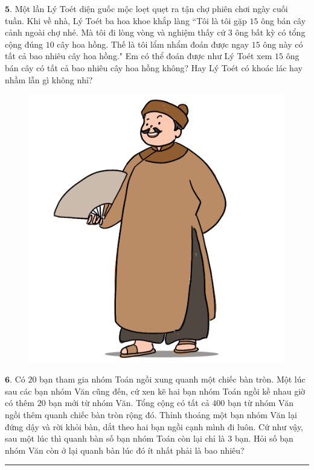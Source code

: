 \begin{multicols}{2}
\begin{figure}[H]
		\vspace*{-20pt}
	\end{figure}
	$\pmb{5.}$ Một lần Lý Toét diện guốc mộc loẹt quẹt ra tận chợ phiên chơi ngày cuối tuần. Khi về nhà, Lý Toét ba hoa khoe khắp làng ``Tôi là tôi gặp $15$ ông bán cây cảnh ngoài chợ nhé. Mà tôi đi lòng vòng và nghiệm thấy cứ $3$ ông bất kỳ có tổng cộng đúng $10$ cây hoa hồng. Thế là tôi lẩm nhẩm đoán được ngay $15$ ông này có tất cả bao nhiêu cây hoa hồng."
	\vskip 0.1cm
	Em có thể đoán được như Lý Toét xem $15$ ông bán cây có tất cả bao nhiêu cây hoa hồng không? Hay Lý Toét có khoác lác hay nhầm lẫn gì không nhỉ?
	\begin{figure}[H]
		\centering
		\captionsetup{labelformat= empty, justification=centering}
		\includegraphics[width=0.58\linewidth]{Pi12_Bai5}
		\vspace*{-15pt}
	\end{figure}
	$\pmb{6.}$ Có $20$ bạn tham gia nhóm Toán ngồi xung quanh một chiếc bàn tròn. Một lúc sau các bạn nhóm Văn cũng đến, cứ xen kẽ hai bạn nhóm Toán ngồi kề nhau giờ có thêm $20$ bạn mới từ nhóm Văn. Tổng cộng có tất cả $400$ bạn từ nhóm Văn ngồi thêm quanh chiếc bàn tròn rộng đó. Thỉnh thoảng một bạn nhóm Văn lại đứng dậy và rời khỏi bàn, dắt theo hai bạn ngồi cạnh mình đi luôn. Cứ như vậy, sau một lúc thì quanh bàn số bạn nhóm Toán còn lại chỉ là $3$ bạn. Hỏi số bạn nhóm Văn còn ở lại quanh bàn lúc đó ít nhất phải là bao nhiêu?
\end{multicols}
\vspace*{-12pt}
\rule{1\linewidth}{0.1pt}
\begingroup
